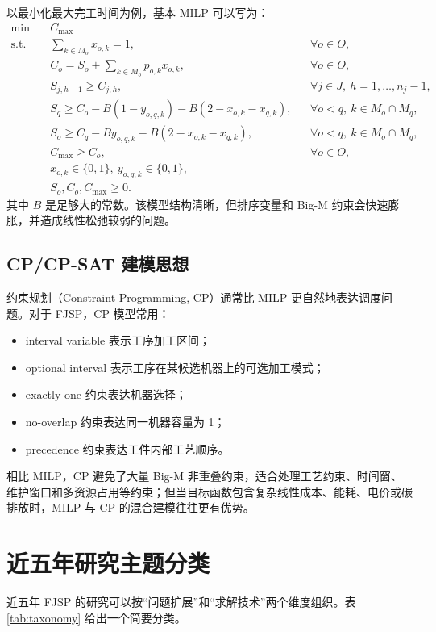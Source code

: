 \documentclass[UTF8,a4paper,11pt]{ctexart}
\newcommand{\Cmax}{C_{\max}}
\begin{document}
以最小化最大完工时间为例，基本 MILP 可以写为：
\begin{align}
\min\quad & \Cmax \\
\text{s.t.}\quad
& \sum_{k\in M_o}x_{o,k}=1, && \forall o\in O, \\
& C_o = S_o + \sum_{k\in M_o}p_{o,k}x_{o,k}, && \forall o\in O,\\
& S_{j,h+1}\geq C_{j,h}, && \forall j\in J,\ h=1,\ldots,n_j-1,\\
& S_q \geq C_o - B(1-y_{o,q,k})-B(2-x_{o,k}-x_{q,k}), && \forall o<q,\ k\in M_o\cap M_q,\\
& S_o \geq C_q - By_{o,q,k}-B(2-x_{o,k}-x_{q,k}), && \forall o<q,\ k\in M_o\cap M_q,\\
& \Cmax\geq C_o, && \forall o\in O,\\
& x_{o,k}\in\{0,1\},\ y_{o,q,k}\in\{0,1\}, && \\
& S_o,C_o,\Cmax\geq 0. &&
\end{align}
其中 $B$ 是足够大的常数。该模型结构清晰，但排序变量和 Big-M 约束会快速膨胀，并造成线性松弛较弱的问题。

\subsection{CP/CP-SAT 建模思想}

约束规划（Constraint Programming, CP）通常比 MILP 更自然地表达调度问题。对于 FJSP，CP 模型常用：
\begin{itemize}
    \item interval variable 表示工序加工区间；
    \item optional interval 表示工序在某候选机器上的可选加工模式；
    \item exactly-one 约束表达机器选择；
    \item no-overlap 约束表达同一机器容量为 1；
    \item precedence 约束表达工件内部工艺顺序。
\end{itemize}
相比 MILP，CP 避免了大量 Big-M 非重叠约束，适合处理工艺约束、时间窗、维护窗口和多资源占用等约束；但当目标函数包含复杂线性成本、能耗、电价或碳排放时，MILP 与 CP 的混合建模往往更有优势。

\section{近五年研究主题分类}

近五年 FJSP 的研究可以按“问题扩展”和“求解技术”两个维度组织。表 \ref{tab:taxonomy} 给出一个简要分类。
\end{document}
